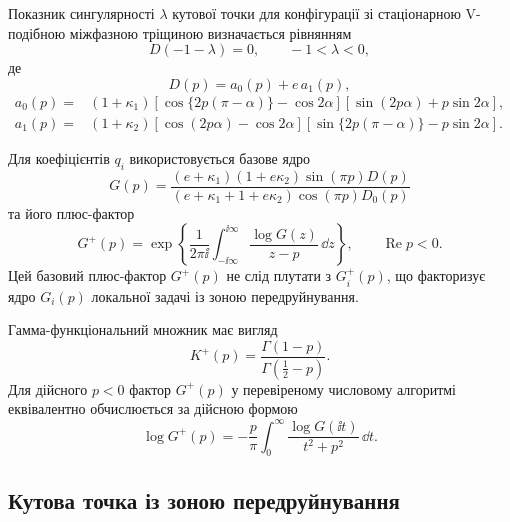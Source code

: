 Показник сингулярності $\lambda$ кутової точки для конфігурації зі
стаціонарною V-подібною міжфазною тріщиною визначається рівнянням
\begin{equation}
\label{eq:app-D-root}
  D(-1-\lambda)=0,
  \qquad -1<\lambda<0,
\end{equation}
де
\begin{equation*}
  D(p)=a_0(p)+e\,a_1(p),
\end{equation*}
\begin{equation*}
\begin{aligned}
  a_0(p)={}&(1+\kappa_1)
  [\cos\{2p(\pi-\alpha)\}-\cos2\alpha]
  [\sin(2p\alpha)+p\sin2\alpha],\\
  a_1(p)={}&(1+\kappa_2)
  [\cos(2p\alpha)-\cos2\alpha]
  [\sin\{2p(\pi-\alpha)\}-p\sin2\alpha].
\end{aligned}
\end{equation*}

Для коефіцієнтів $q_i$ використовується базове ядро
\begin{equation*}
  G(p)=
  \frac{(e+\kappa_1)(1+e\kappa_2)\sin(\pi p)D(p)}
  {(e+\kappa_1+1+e\kappa_2)\cos(\pi p)D_0(p)}
\end{equation*}
та його плюс-фактор
\begin{equation*}
  G^+(p)=
  \exp\!\left\{
    \frac{1}{2\pi\ii}
    \int_{-\ii\infty}^{\ii\infty}
    \frac{\log G(z)}{z-p}\,\dd z
  \right\},
  \qquad \operatorname{Re}p<0.
\end{equation*}
Цей базовий плюс-фактор $G^+(p)$ не слід плутати з
$G_i^+(p)$, що факторизує ядро $G_i(p)$ локальної задачі із зоною
передруйнування.

Гамма-функціональний множник має вигляд
\begin{equation*}
  K^+(p)=\frac{\Gamma(1-p)}{\Gamma(\tfrac12-p)}.
\end{equation*}
Для дійсного $p<0$ фактор $G^+(p)$ у перевіреному числовому алгоритмі
еквівалентно обчислюється за дійсною формою
\begin{equation*}
  \log G^+(p)
  =-\frac{p}{\pi}\int_0^\infty
    \frac{\log G(\ii t)}{t^2+p^2}\,\dd t.
\end{equation*}

\subsection{Кутова точка із зоною передруйнування}

